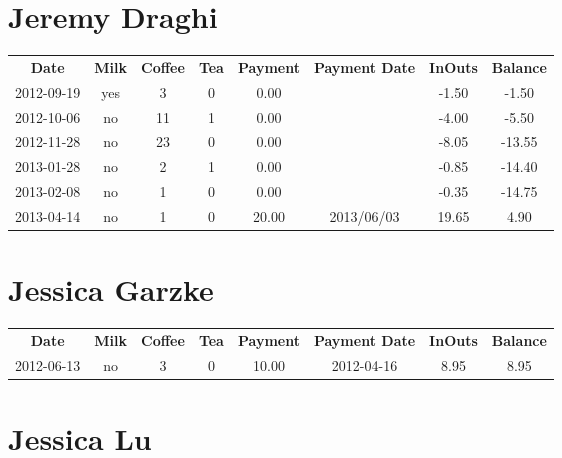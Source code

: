 \section{Jeremy Draghi}

\begin{center}
\begin{tabular}{cccccccc}
\textbf{Date} & \textbf{Milk} & \textbf{Coffee} & \textbf{Tea} & \textbf{Payment} & \textbf{Payment Date} & \textbf{InOuts} & \textbf{Balance} \\
2012-09-19 & yes &  3 & 0 &  0.00 &  & -1.50 &  -1.50\\ 
2012-10-06 & no & 11 & 1 &  0.00 &  & -4.00 &  -5.50\\ 
2012-11-28 & no & 23 & 0 &  0.00 &  & -8.05 & -13.55\\ 
2013-01-28 & no &  2 & 1 &  0.00 &  & -0.85 & -14.40\\ 
2013-02-08 & no &  1 & 0 &  0.00 &  & -0.35 & -14.75\\ 
2013-04-14 & no &  1 & 0 & 20.00 & 2013/06/03 & 19.65 &   4.90
\end{tabular}
\end{center}

\section{Jessica Garzke}

\begin{center}
\begin{tabular}{cccccccc}
\textbf{Date} & \textbf{Milk} & \textbf{Coffee} & \textbf{Tea} & \textbf{Payment} & \textbf{Payment Date} & \textbf{InOuts} & \textbf{Balance} \\
2012-06-13 & no & 3 & 0 & 10.00 & 2012-04-16 & 8.95 & 8.95
\end{tabular}
\end{center}

\section{Jessica Lu}

